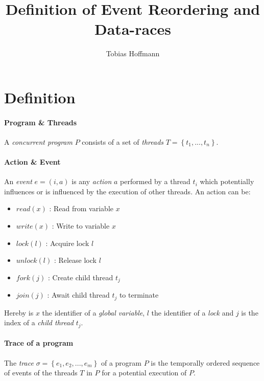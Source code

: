 \documentclass[a4paper,UKenglish,cleveref, autoref, thm-restate]{lipics-v2021}
\title{Definition of Event Reordering and Data-races}
\author{Tobias Hoffmann}{Albert-Ludwigs-Universität Freiburg, Germany}{garbaz@t-online.de}{}{}
\begin{document}
\maketitle


\section{Definition}
\label{sec:definition}

\paragraph*{Program \& Threads}
A \textit{concurrent program} $P$ consists of a set of \textit{threads} $T = \left\{ t_1, ..., t_n \right\}$.

\paragraph*{Action \& Event}

An \textit{event} $e = (i, a)$ is any \textit{action} $a$ performed by a thread $t_i$ which potentially influences or is influenced by the execution of other threads. An action can be:

\begin{itemize}
    \item $read(x)$ : Read from variable $x$
    \item $write(x)$ : Write to variable $x$
    \item $lock(l)$ : Acquire lock $l$
    \item $unlock(l)$ : Release lock $l$
    \item $fork(j)$ : Create child thread $t_j$
    \item $join(j)$ : Await child thread $t_j$ to terminate
\end{itemize}

Hereby is $x$ the identifier of a \textit{global variable}, $l$ the identifier of a \textit{lock} and $j$ is the index of a \textit{child thread} $t_j$.

\paragraph*{Trace of a program}

The \textit{trace} $\sigma = \left\{ e_1 , e_2 , ..., e_m \right\}$ of a program $P$ is the temporally ordered sequence of events of the threads $T$ in $P$ for a potential execution of $P$.
\end{document}
